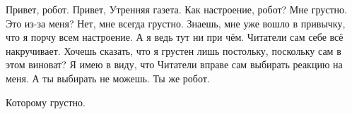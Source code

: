 \begin{dialog}
\X Привет, робот.
\R Привет, Утренняя газета.
\X Как настроение, робот?
\R Мне грустно.
\X Это из-за меня?
\R Нет, мне всегда грустно.
\X Знаешь, мне уже вошло в привычку, что я порчу всем настроение. А я ведь тут ни при чём. Читатели сам себе всё накручивает.
\R Хочешь сказать, что я грустен лишь постольку, поскольку сам в этом виноват?
\X Я имею в виду, что Читатели вправе сам выбирать реакцию на меня. А ты выбирать не можешь. Ты же робот.
\end{dialog}

\begin{monolog} %
\end{monolog}

\begin{dialog}
\X Которому грустно.
\end{dialog}